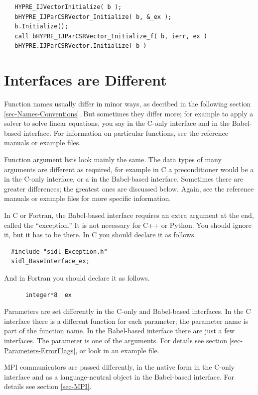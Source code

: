 \begin{verbatim}
   HYPRE_IJVectorInitialize( b );
   bHYPRE_IJParCSRVector_Initialize( b, &_ex );
   b.Initialize();
   call bHYPRE_IJParCSRVector_Initialize_f( b, ierr, ex )
   bHYPRE.IJParCSRVector.Initialize( b )
\end{verbatim}


\section{Interfaces are Different}
\label{sec-Interfaces-Different}

Function names usually differ in minor ways, as decribed in the
following section \ref{sec-Names-Conventions}.  But sometimes they
differ more; for example to apply a solver to solve linear equations,
you say  in the C-only interface and  in the
Babel-based interface.  For information on particular functions, see
the reference manuals or example files.

Function argument lists look mainly the same.  The data types of many
arguments are different as required, for example in C a preconditioner
would be a  in the C-only interface, or a
 in the Babel-based interface.  Sometimes there
are greater differences; the greatest ones are discussed below.
Again, see the reference manuals or example files for more specific
information.

In C or Fortran, the Babel-based interface requires an extra argument
at the end, called the ``exception.''  It is not necessary for C++ or
Python.  You should ignore it, but it has to be there.  In C you
should declare it as follows.
\begin{verbatim}
  #include "sidl_Exception.h"
  sidl_BaseInterface_ex;
\end{verbatim}
And in Fortran you should declare it as follows.
\begin{verbatim}
      integer*8  ex
\end{verbatim}

Parameters are set differently in the C-only and Babel-based
interfaces.  In the C interface there is a different 
function for each parameter; the parameter name is part of the
function name.  In the Babel-based interface there are just a few
 interfaces.  The parameter is one of the
arguments.  For details see section
\ref{sec-Parameters-ErrorFlags}, or look in an example file.

MPI communicators are passed differently, in the native form in the
C-only interface and as a language-neutral object in the Babel-based
interface.  For details see section \ref{sec-MPI}.

